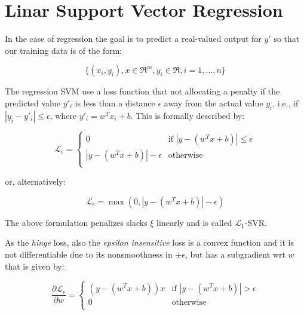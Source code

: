 \section{Linar Support Vector Regression}

In the case of regression the goal is to predict a real-valued output for $y'$ so that our training data is of the form:

\begin{equation}
	\{(x_i,y_i), x\in\Re^{m}, y_i\in\Re, i=1, \dots, n\} \tag{2.1}
\end{equation}

The regression SVM use a loss function that not allocating a penalty if the predicted value $y'_i$ is less than a distance $\epsilon$ away from the actual value $y_i$, i.e., if $|y_i-y'_i| \leq \epsilon$, where $y'_i = w^T x_i + b$. This is formally described by:

\begin{equation}
	\mathcal{L}_\epsilon = 
	\begin{cases}
		0 & \text{if } |y - (w^T x + b)| \leq \epsilon \\
		|y - (w^T x + b)| - \epsilon & \text{otherwise} \\
	\end{cases} \tag{2.2a}
\end{equation}

or, alternatively:

\begin{equation}
	\mathcal{L}_\epsilon = \max(0, |y - (w^T x + b)| - \epsilon) \tag{2.2b}
\end{equation}

The above formulation penalizes slacks $\xi$ linearly and is called $\mathcal{L}_1$-SVR.

As the \emph{hinge} loss, also the \emph{epsilon insensitive} loss is a convex function and it is not differentiable due to its nonsmoothness in $\pm\epsilon$, but has a subgradient wrt $w$ that is given by:

\begin{equation}
    \displaystyle \frac{\partial \mathcal{L_\epsilon}}{\partial w}=
        \begin{cases}
            (y - (w^T x + b)) x & \text{if } |y - (w^T x + b)| > \epsilon \\
            0 & \text{otherwise} \\ 
        \end{cases} \tag{2.3}
\end{equation}

